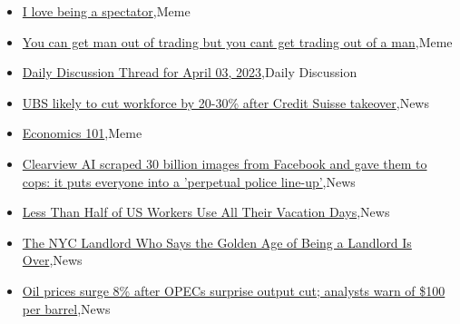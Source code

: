 \documentclass{article}%
\begin{document}
%
\begin{itemize}%
\item%
\href{https://reddit.com/r/wallstreetbets/comments/12ah0bf/i\_love\_being\_a\_spectator/}{I love being a spectator},Meme%
\item%
\href{https://reddit.com/r/wallstreetbets/comments/12agghg/you\_can\_get\_man\_out\_of\_trading\_but\_you\_cant\_get/}{You can get man out of trading but you cant get trading out of a man},Meme%
\item%
\href{https://reddit.com/r/wallstreetbets/comments/12aficj/daily\_discussion\_thread\_for\_april\_03\_2023/}{Daily Discussion Thread for April 03, 2023},Daily Discussion%
\item%
\href{https://reddit.com/r/wallstreetbets/comments/12affq8/ubs\_likely\_to\_cut\_workforce\_by\_2030\_after\_credit/}{UBS likely to cut workforce by 20-30\% after Credit Suisse takeover},News%
\item%
\href{https://reddit.com/r/wallstreetbets/comments/12ac0qy/economics\_101/}{Economics 101},Meme%
\item%
\href{https://reddit.com/r/wallstreetbets/comments/12aa14m/clearview\_ai\_scraped\_30\_billion\_images\_from/}{Clearview AI scraped 30 billion images from Facebook and gave them to cops: it puts everyone into a 'perpetual police line-up'},News%
\item%
\href{https://reddit.com/r/Economics/comments/12ahbon/less\_than\_half\_of\_us\_workers\_use\_all\_their/}{Less Than Half of US Workers Use All Their Vacation Days},News%
\item%
\href{https://reddit.com/r/Economics/comments/12aha8v/the\_nyc\_landlord\_who\_says\_the\_golden\_age\_of\_being/}{The NYC Landlord Who Says the Golden Age of Being a Landlord Is Over},News%
\item%
\href{https://reddit.com/r/Economics/comments/12ad2nm/oil\_prices\_surge\_8\_after\_opecs\_surprise\_output/}{Oil prices surge 8\% after OPECs surprise output cut; analysts warn of \$100 per barrel},News%
\end{itemize}%
\end{document}
